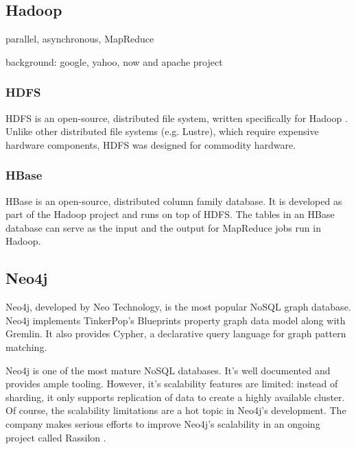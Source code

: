 \subsection{Hadoop}

parallel, asynchronous, MapReduce

background: google, yahoo, now and apache project


\subsubsection{HDFS}

HDFS is an open-source, distributed file system, written specifically for Hadoop \cite{Hadoop}. Unlike other distributed file systems (e.g. Lustre), which require expensive hardware components, HDFS was designed for commodity hardware.



\subsubsection{HBase}

HBase is an open-source, distributed column family database. It is developed as part of the Hadoop project and runs on top of HDFS. The tables in an HBase database can serve as the input and the output for MapReduce jobs run in Hadoop.

\subsection{Neo4j}

Neo4j, developed by Neo Technology, is the most popular NoSQL graph database. Neo4j implements TinkerPop's Blueprints property graph data model along with Gremlin. It also provides Cypher, a declarative query language for graph pattern matching. 

Neo4j is one of the most mature NoSQL databases. It's well documented and provides ample tooling. However, it's scalability features are limited: instead of sharding, it only supports replication of data to create a highly available cluster. Of course, the scalability limitations are a hot topic in Neo4j's development. The company makes serious efforts to improve Neo4j's scalability in an ongoing project called Rassilon \cite{rassilon}.

